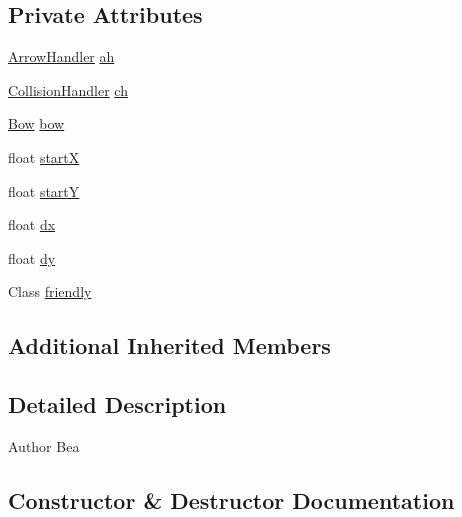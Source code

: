 \subsection*{Private Attributes}
\begin{DoxyCompactItemize}
\item 
\mbox{\hyperlink{classitems_1_1weapons_1_1_arrow_handler}{Arrow\+Handler}} \mbox{\hyperlink{classitems_1_1weapons_1_1_arrow_a53eef20648312917e2c7b4405cd24c2c}{ah}}
\item 
\mbox{\hyperlink{classentities_1_1_collision_handler}{Collision\+Handler}} \mbox{\hyperlink{classitems_1_1weapons_1_1_arrow_aca68c367f384774a6c0dc1c123ca4138}{ch}}
\item 
\mbox{\hyperlink{classitems_1_1weapons_1_1_bow}{Bow}} \mbox{\hyperlink{classitems_1_1weapons_1_1_arrow_a40f42a19ccd51554f27628716170d1f3}{bow}}
\item 
float \mbox{\hyperlink{classitems_1_1weapons_1_1_arrow_adc8677c8a2283f755279eb2a26458194}{startX}}
\item 
float \mbox{\hyperlink{classitems_1_1weapons_1_1_arrow_ac5893f6e4f68869b45120a6a4e0d8c48}{startY}}
\item 
float \mbox{\hyperlink{classitems_1_1weapons_1_1_arrow_ad0f19f917fe7af158738ad8dadc0d0eb}{dx}}
\item 
float \mbox{\hyperlink{classitems_1_1weapons_1_1_arrow_a41b7f69adb414e3b19c40785b6225b9c}{dy}}
\item 
Class \mbox{\hyperlink{classitems_1_1weapons_1_1_arrow_a3b020ae7197868d31adf452c56fd00ec}{friendly}}
\end{DoxyCompactItemize}
\subsection*{Additional Inherited Members}


\subsection{Detailed Description}
\begin{DoxyAuthor}{Author}
Bea 
\end{DoxyAuthor}


\subsection{Constructor \& Destructor Documentation}
\mbox{\label{classitems_1_1weapons_1_1_arrow_af78ba07ad4164f9ad7b5f5380224c4ce}} 
